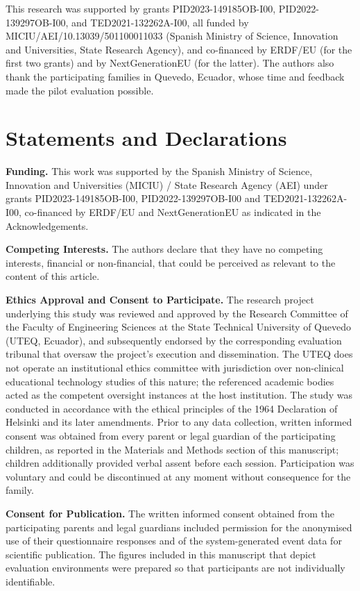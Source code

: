 \documentclass[pdflatex,sn-apa]{sn-jnl}
\begin{document}
\backmatter

    This research was supported by grants PID2023-149185OB-I00, PID2022-139297OB-I00, and TED2021-132262A-I00, all funded by MICIU/AEI/10.13039/501100011033 (Spanish Ministry of Science, Innovation and Universities, State Research Agency), and co-financed by ERDF/EU (for the first two grants) and by NextGenerationEU (for the latter).
    The authors also thank the participating families in Quevedo, Ecuador, whose time and feedback made the pilot evaluation possible.

\section*{Statements and Declarations}

    \textbf{Funding.}
        This work was supported by the Spanish Ministry of Science, Innovation and Universities (MICIU) / State Research Agency (AEI) under grants PID2023-149185OB-I00, PID2022-139297OB-I00 and TED2021-132262A-I00, co-financed by ERDF/EU and NextGenerationEU as indicated in the Acknowledgements.

    \textbf{Competing Interests.}
        The authors declare that they have no competing interests, financial or non-financial, that could be perceived as relevant to the content of this article.

    \textbf{Ethics Approval and Consent to Participate.}
        The research project underlying this study was reviewed and approved by the Research Committee of the Faculty of Engineering Sciences at the State Technical University of Quevedo (UTEQ, Ecuador), and subsequently endorsed by the corresponding evaluation tribunal that oversaw the project's execution and dissemination. The UTEQ does not operate an institutional ethics committee with jurisdiction over non-clinical educational technology studies of this nature; the referenced academic bodies acted as the competent oversight instances at the host institution. The study was conducted in accordance with the ethical principles of the 1964 Declaration of Helsinki and its later amendments. Prior to any data collection, written informed consent was obtained from every parent or legal guardian of the participating children, as reported in the Materials and Methods section of this manuscript; children additionally provided verbal assent before each session. Participation was voluntary and could be discontinued at any moment without consequence for the family.

    \textbf{Consent for Publication.}
        The written informed consent obtained from the participating parents and legal guardians included permission for the anonymised use of their questionnaire responses and of the system-generated event data for scientific publication. The figures included in this manuscript that depict evaluation environments were prepared so that participants are not individually identifiable.
\end{document}
